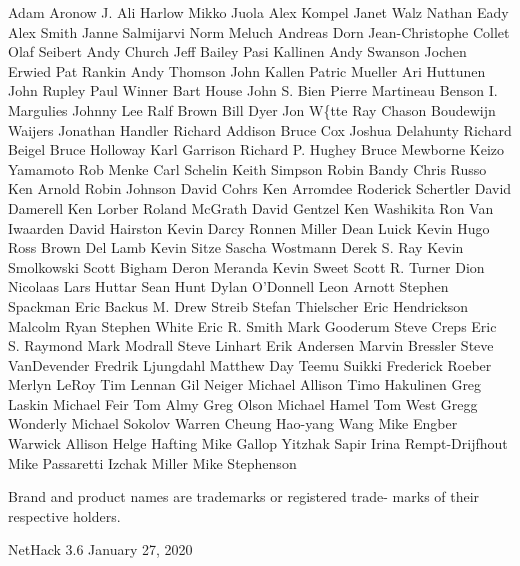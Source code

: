 \documentclass[11pt]{article}
\begin{document}
   Adam Aronow      J. Ali Harlow     Mikko Juola
   Alex Kompel       Janet Walz      Nathan Eady
   Alex Smith      Janne Salmijarvi    Norm Meluch
  Andreas Dorn    Jean-Christophe Collet   Olaf Seibert
   Andy Church      Jeff Bailey     Pasi Kallinen
  Andy Swanson      Jochen Erwied      Pat Rankin
  Andy Thomson      John Kallen     Patric Mueller
  Ari Huttunen      John Rupley      Paul Winner
   Bart House       John S. Bien    Pierre Martineau
 Benson I. Margulies     Johnny Lee      Ralf Brown
   Bill Dyer       Jon W\{tte       Ray Chason
 Boudewijn Waijers    Jonathan Handler   Richard Addison
   Bruce Cox      Joshua Delahunty    Richard Beigel
  Bruce Holloway     Karl Garrison    Richard P. Hughey
  Bruce Mewborne     Keizo Yamamoto     Rob Menke
  Carl Schelin      Keith Simpson     Robin Bandy
   Chris Russo       Ken Arnold     Robin Johnson
   David Cohrs      Ken Arromdee    Roderick Schertler
  David Damerell      Ken Lorber     Roland McGrath
  David Gentzel     Ken Washikita    Ron Van Iwaarden
  David Hairston      Kevin Darcy     Ronnen Miller
   Dean Luick       Kevin Hugo      Ross Brown
   Del Lamb       Kevin Sitze     Sascha Wostmann
  Derek S. Ray     Kevin Smolkowski    Scott Bigham
  Deron Meranda      Kevin Sweet     Scott R. Turner
  Dion Nicolaas      Lars Huttar      Sean Hunt
  Dylan O'Donnell     Leon Arnott     Stephen Spackman
   Eric Backus      M. Drew Streib   Stefan Thielscher
 Eric Hendrickson     Malcolm Ryan     Stephen White
  Eric R. Smith     Mark Gooderum     Steve Creps
  Eric S. Raymond     Mark Modrall     Steve Linhart
  Erik Andersen     Marvin Bressler   Steve VanDevender
 Fredrik Ljungdahl     Matthew Day      Teemu Suikki
 Frederick Roeber     Merlyn LeRoy      Tim Lennan
   Gil Neiger      Michael Allison    Timo Hakulinen
   Greg Laskin      Michael Feir      Tom Almy
   Greg Olson      Michael Hamel      Tom West
  Gregg Wonderly     Michael Sokolov    Warren Cheung
  Hao-yang Wang      Mike Engber     Warwick Allison
  Helge Hafting      Mike Gallop     Yitzhak Sapir
Irina Rempt-Drijfhout   Mike Passaretti
  Izchak Miller     Mike Stephenson

   Brand and product names are trademarks or registered trade-
marks of their respective holders.











NetHack 3.6                   January 27, 2020
\end{document}
